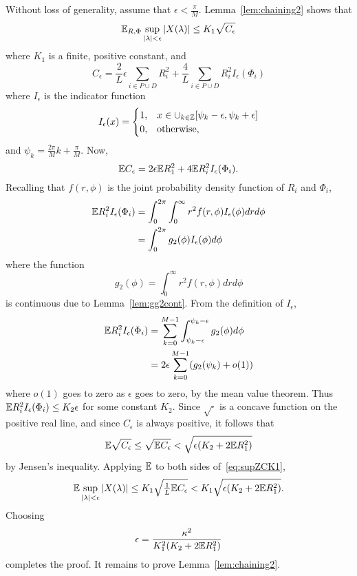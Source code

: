 \documentclass[journal]{IEEEtran}
\begin{document}
\begin{IEEEproof}
Without loss of generality, assume that $\epsilon < \tfrac{\pi}{M}$.  Lemma~\ref{lem:chaining2} shows that
\begin{equation}\label{eq:supZCK1} 
{\mathbb E}_{R,\Phi} \sup_{{\vert \lambda \vert} < \epsilon} {\left\vert  X(\lambda)  \right\vert} \leq K_1 \sqrt{C_\epsilon}
\end{equation}
where $K_1$ is a finite, positive constant, and
\begin{equation}\label{eq:Cepsdefn}
C_\epsilon = \frac{2}{L}\epsilon\sum_{i\in P \cup D}R_i^2 + \frac{4}{L}\sum_{i\in P \cup D}R_i^2 I_{\epsilon}(\Phi_i)
\end{equation}
where $I_\epsilon$ is the indicator function
\[
I_{\epsilon}(x) = \begin{cases}
1, & x \in \cup_{k\in{\mathbb Z}}[\psi_k - \epsilon, \psi_k + \epsilon] \\
0, & \text{otherwise},
\end{cases}
\] 
and $\psi_k = \tfrac{2\pi}{M}k + \tfrac{\pi}{M}$.  Now,
\[
{\mathbb E} C_\epsilon =  2\epsilon{\mathbb E} R_1^2 + 4 {\mathbb E} R_i^2 I_{\epsilon}(\Phi_i).
\]
Recalling that $f(r,\phi)$ is the joint probability density function of $R_i$ and $\Phi_i$,
\begin{align*}
{\mathbb E} R_i^2 I_\epsilon(\Phi_i) &= \int_0^{2\pi} \int_{0}^\infty  r^2 f(r,\phi) I_\epsilon(\phi) dr d\phi \\ 
&= \int_0^{2\pi}g_2(\phi) I_\epsilon(\phi) d\phi 
\end{align*}
where the function
\[
g_2(\phi) = \int_{0}^\infty  r^2 f(r,\phi) dr d\phi 
\]
is continuous due to Lemma~\ref{lem:gg2cont}.  From the definition of $I_\epsilon$,
\begin{align*}
{\mathbb E} R_i^2 I_\epsilon(\Phi_i) &= \sum_{k=0}^{M-1}\int_{\psi_k-\epsilon}^{\psi_k-\epsilon}g_2(\phi) d\phi \\
&= 2\epsilon \sum_{k=0}^{M-1} (g_2(\psi_k) + o(1))
\end{align*}
where $o(1)$ goes to zero as $\epsilon$ goes to zero, by the mean value theorem.  Thus ${\mathbb E} R_i^2 I_\epsilon(\Phi_i) \leq K_2\epsilon$ for some constant $K_2$. Since $\sqrt{\cdot}$ is a concave function on the positive real line, and since $C_{\epsilon}$ is always positive, it follows that
\[
{\mathbb E} \sqrt{C_\epsilon} \leq  \sqrt{{\mathbb E}  C_\epsilon} < \sqrt{\epsilon( K_2 + 2{\mathbb E} R_1^2)  }
\]
by Jensen's inequality.  Applying ${\mathbb E}$ to both sides of~\eqref{eq:supZCK1},
\[
{\mathbb E} \sup_{{\vert \lambda \vert} < \epsilon} {\left\vert  X(\lambda)  \right\vert} \leq K_1 \sqrt{\tfrac{1}{L}{\mathbb E} C_\epsilon} < K_1 \sqrt{\epsilon( K_2 + 2{\mathbb E} R_1^2)}.
\]
Choosing 
\[
\epsilon = \frac{\kappa^2}{ K_1^2 ( K_2 + 2{\mathbb E} R_1^2)}
\] 
completes the proof.  It remains to prove Lemma~\ref{lem:chaining2}.
\end{IEEEproof}
\end{document}
